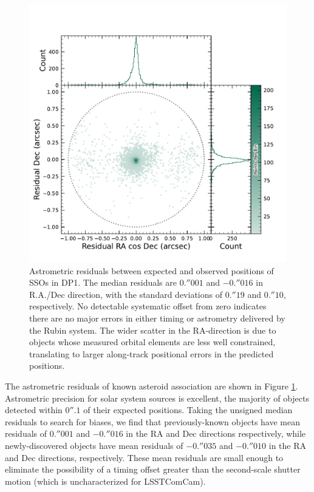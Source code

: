 \begin{figure}[htb!]
\centering
\includegraphics[width=0.98\linewidth]{figures/sso_residuals.pdf}
\caption{Astrometric residuals between expected and observed positions of SSOs in \gls{DP1}. The median residuals are $0.''001$ and $-0.''016$ in R.A./Dec direction, with the standard deviations of $0.''19$ and $0.''10$, respectively. No detectable systematic offset from zero indicates there are no major errors in either timing or astrometry delivered by the Rubin system. The wider scatter in the RA-direction is due to objects whose measured orbital elements are less well constrained, translating to larger along-track positional errors in the predicted positions.}
\label{fig:sso_residuals}
\vspace{0.1cm}
\end{figure}

The astrometric residuals of known asteroid association are shown in Figure \ref{fig:sso_residuals}. 
Astrometric precision for solar system sources is excellent, the majority of objects detected within $0''.1$ of their expected positions. 
Taking the unsigned median residuals to search for biases, we find that previously-known objects have mean residuals of $0.''001$ and $-0.''016$ in the \gls{RA} and Dec directions respectively, while newly-discovered objects have mean residuals of $-0.''035$ and $-0.''010$ in the \gls{RA} and Dec directions, respectively. 
These mean residuals are small enough to eliminate the possibility of a timing offset greater than the second-scale shutter motion (which is uncharacterized for LSSTComCam).

